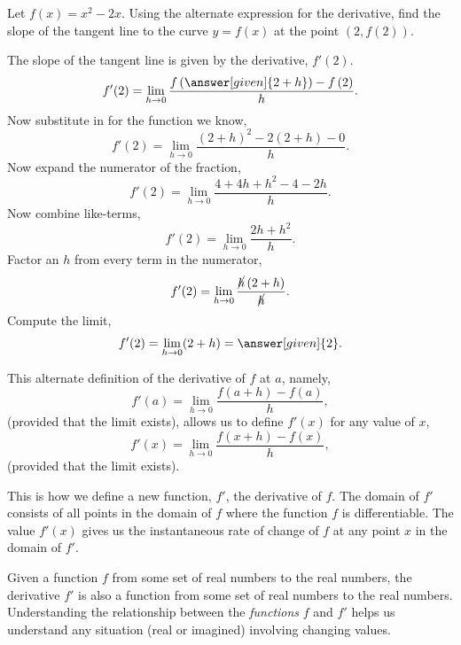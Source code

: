 \documentclass{ximera}
\begin{document}
\begin{example}
 Let $f(x) = x^2-2x$. Using the alternate expression for the derivative, find the slope of the tangent line to the curve $y=f(x)$ at the point $(2,f(2))$.
  \begin{explanation}
   The slope of the tangent line is given by the derivative, $f'(2)$.
    \[ f'(2) =  \lim_{h\to 0}\frac{f\left(\answer[given]{2+h}\right)-f\left(2\right)}{h}. \]
    Now substitute in for the function we know,
    \[ f'(2) = \lim_{h\to 0}\frac{(2+h)^2-2(2+h) -0}{h}.\]
    Now expand the numerator of the fraction,
    \[ f'(2) =\lim_{h\to 0}  \frac{4+4h+h^2-4-2h }{h}. \]
    Now combine like-terms,
    \[ f'(2) = \lim_{h\to 0} \frac{2h+h^2}{h}.\]
    Factor an $h$ from every term in the numerator,
    \[  f'(2) =  \lim_{h\to 0}\frac{\cancel{h}\left(2+h\right)}{\cancel{h}}. \]
  Compute the limit,
    \[ f'(2) =  \lim_{h\to 0}(2+h)=\answer[given]{2}.  \]
  \end{explanation}
\end{example}


	
This alternate definition of the derivative of $f$ at $a$, namely,
\[ f'(a) = \lim_{h\to 0}\frac{f(a+h)-f(a)}{h}, \]
(provided that the limit exists), allows us to define $f'(x)$ for any value of $x$, 
\[ f'(x) = \lim_{h\to 0}\frac{f(x+h)-f(x)}{h},\]
(provided that the limit exists).

This is how we define a new function, $f'$, the derivative of $f$. The domain of $f'$ consists of all points in the domain of 
$f$ where the function $f$ is differentiable. The value $f'(x)$ gives us the instantaneous rate of change of $f$ at any point $x$ in the domain of $f'$.\\

\begin{comment}
	\begin{warning}
	  The notation:
	  \begin{quote}
	  $f'(a)$ means take the derivative of $f$ first, then evaluate at
	    $x=a$.
	  \end{quote}
	  In other words, given $f$ a function of $x$
	  \[ f'(a) = \eval{\ddx f(x)}_{x=a}. \]
	\end{warning}
\end{comment}

Given a function $f$ from  some set of real numbers to the real numbers, the
derivative $f'$ is also a function from some set of real numbers to the real
numbers. Understanding the relationship between the \textit{functions}
$f$ and $f'$ helps us understand any situation (real or imagined)
involving changing values.
\end{document}
